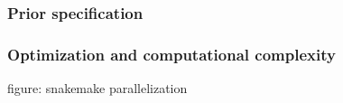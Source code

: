       \subsubsection{Prior specification}
      \subsubsection{Optimization and computational complexity}
      figure: snakemake parallelization



